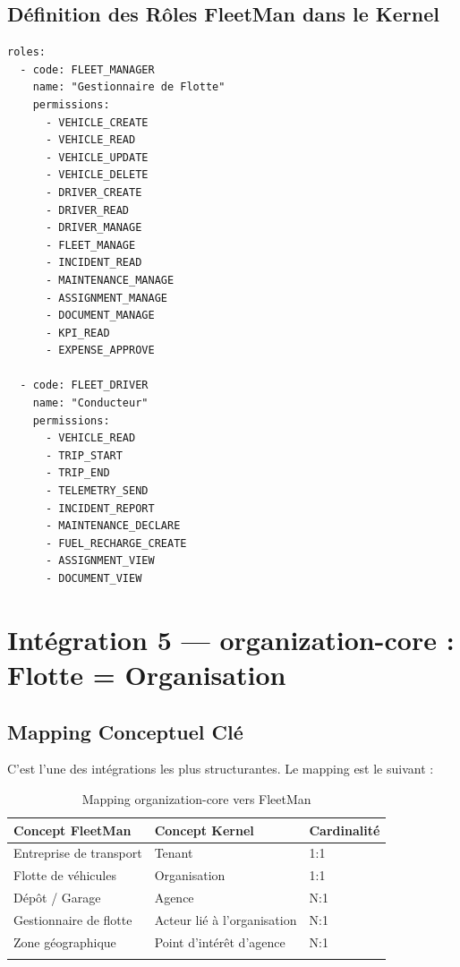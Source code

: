 \documentclass[12pt,a4paper]{report}
\begin{document}
\subsection{Définition des Rôles FleetMan dans le Kernel}

\begin{lstlisting}[style=yamlStyle, caption={Templates de rôles FleetMan à provisionner dans le Kernel}]
roles:
  - code: FLEET_MANAGER
    name: "Gestionnaire de Flotte"
    permissions:
      - VEHICLE_CREATE
      - VEHICLE_READ
      - VEHICLE_UPDATE
      - VEHICLE_DELETE
      - DRIVER_CREATE
      - DRIVER_READ
      - DRIVER_MANAGE
      - FLEET_MANAGE
      - INCIDENT_READ
      - MAINTENANCE_MANAGE
      - ASSIGNMENT_MANAGE
      - DOCUMENT_MANAGE
      - KPI_READ
      - EXPENSE_APPROVE

  - code: FLEET_DRIVER
    name: "Conducteur"
    permissions:
      - VEHICLE_READ
      - TRIP_START
      - TRIP_END
      - TELEMETRY_SEND
      - INCIDENT_REPORT
      - MAINTENANCE_DECLARE
      - FUEL_RECHARGE_CREATE
      - ASSIGNMENT_VIEW
      - DOCUMENT_VIEW
\end{lstlisting}

\section{Intégration 5 — organization-core : Flotte = Organisation}

\subsection{Mapping Conceptuel Clé}

C'est l'une des intégrations les plus structurantes. Le mapping est le suivant :

\begin{longtable}{p{5cm}p{5cm}p{3cm}}
\toprule
\textbf{Concept FleetMan} & \textbf{Concept Kernel} & \textbf{Cardinalité} \\
\midrule
\endhead
Entreprise de transport & Tenant & 1:1 \\
Flotte de véhicules & Organisation & 1:1 \\
Dépôt / Garage & Agence & N:1 \\
Gestionnaire de flotte & Acteur lié à l'organisation & N:1 \\
Zone géographique & Point d'intérêt d'agence & N:1 \\
\bottomrule
\caption{Mapping organization-core vers FleetMan}
\end{longtable}
\end{document}
